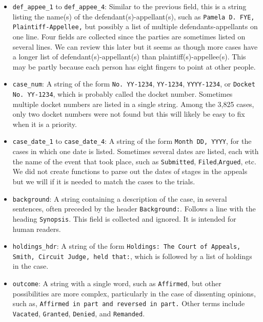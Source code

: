 \documentclass[11pt]{paper}
\begin{document}
\begin{itemize}
	\item \texttt{def\_appee\_1} to \texttt{def\_appee\_4}: 
		Similar to the previous field, this is a string listing 
		the name(s) of the defendant(s)-appellant(s), 
		such as \texttt{Pamela D. FYE, Plaintiff-Appellee,} 
		but possibly a list of multiple defendants-appellants
		on one line. 
		Four fields are collected since the parties are sometimes 
		listed on several lines. 
		We can review this later but it seems as though 
		more cases have a longer list of defendant(s)-appellant(s)
		than plaintiff(s)-appellee(s). 
		This may be partly because each person has eight fingers 
		to point at other people. 

	\item \texttt{case\_num}: A string of the form \texttt{No. YY-1234},  
		\texttt{YY-1234},  \texttt{YYYY-1234}, 
		or  \texttt{Docket No. YY-1234}, 
		which is probably called the docket number. 
		Sometimes multiple docket numbers are listed in a single string.
		Among the 3,825 cases, only two docket numbers were not found
		but this will likely be easy to fix when it is a priority. 

	\item \texttt{case\_date\_1} to \texttt{case\_date\_4}: A string of the form 
		\texttt{Month DD, YYYY}, for the cases in which one date is listed. 
		Sometimes several dates are listed, 
		each with the name of the event that took place, 
		such as \texttt{Submitted}, \texttt{Filed},\texttt{Argued}, etc. 
		We did not create functions to parse out the dates 
		of stages in the appeals but we will if it is needed 
		to match the cases to the trials. 

	\item \texttt{background}: A string containing a description of the case, 
		in several sentences, 
		often preceded by the header \texttt{Background:}. 
		Follows a line with the heading \texttt{Synopsis}. 
		This field is collected and ignored. 
		It is intended for human readers. 

	\item \texttt{holdings\_hdr}: A string of the form 
		\texttt{Holdings: The Court of Appeals, Smith, Circuit Judge, held that:},
		which is followed by a list of holdings in the case. 

	\item \texttt{outcome}: A string with a single word, 
		such as \texttt{Affirmed}, 
		but other possibilities are more complex, 
		particularly in the case of dissenting opinions, 
		such as, \texttt{Affirmed in part and reversed in part.}
		Other terms include \texttt{Vacated}, \texttt{Granted}, 
		\texttt{Denied}, and \texttt{Remanded}. 


\end{itemize}
\end{document}

